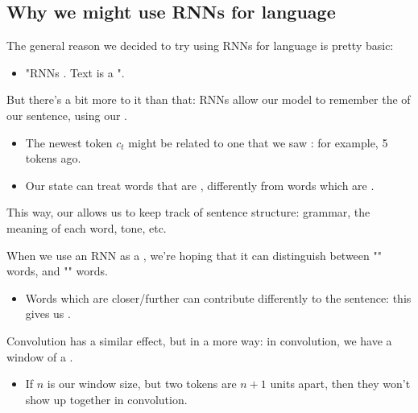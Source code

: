     \pagebreak

    \subsection{Why we might use RNNs for language}

        The general reason we decided to try using RNNs for language is pretty basic:
        
        \begin{itemize}
            \item "RNNs . Text is a ".
        \end{itemize}

        \phantom{}

        But there's a bit more to it than that: RNNs allow our model to remember the  of our sentence, using our .

        \begin{itemize}
            \item The newest token $c_t$ might be related to one that we saw : for example, 5 tokens ago. 

            \item Our state can treat words that are , differently from words which are .
        \end{itemize}

        This way, our  allows us to keep track of sentence structure: grammar, the meaning of each word, tone, etc.\\

        \begin{concept}
            When we use an RNN as a , we're hoping that it can distinguish between "" words, and "" words.

            \begin{itemize}
                \item Words which are closer/further can contribute differently to the sentence: this gives us .
            \end{itemize}
        \end{concept}

        Convolution has a similar effect, but in a more  way: in convolution, we have a window of a . 
        
        \begin{itemize}
            \item If $n$ is our window size, but two tokens are $n+1$ units apart, then they won't show up together in convolution.
        \end{itemize}

